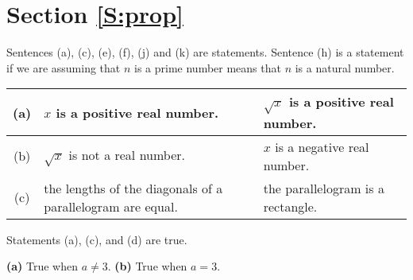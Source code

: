\section*{Section \ref{S:prop}}
\begin{list}{\bf{\ref{exer:sec11-1}.}}
\item Sentences (a), (c), (e), (f), (j) and (k) are statements.  Sentence (h) is a statement if we are assuming that $n$ is a prime number means that  $n$ is a natural number.
\end{list}

\begin{list}{\bf{\ref{exer:sec11-2}.}} \item 
\begin{tabular}[t]{| c | p{1.5in} | p{1.5in} |} \hline
(a) & $x$ is a positive real number. & $\sqrt{x}$ is a positive real number.  \\  \hline
(b) & $\sqrt{x}$ is not a real number. & $x$ is a negative real number. \\ \hline
(c) & the lengths of the diagonals of a parallelogram are equal. & the parallelogram is a rectangle. \\ \hline
\end{tabular}
\end{list}

\begin{list}{\bf{\ref{exer:sec11-3}.}}  
\item Statements (a), (c), and (d) are true.
\end{list}

\begin{list}{\bf{\ref{exer:sec11-4}.}}
\item \textbf{(a)} True when $a \ne 3$.  \textbf{(b)} True when $a= 3$.
\end{list}

